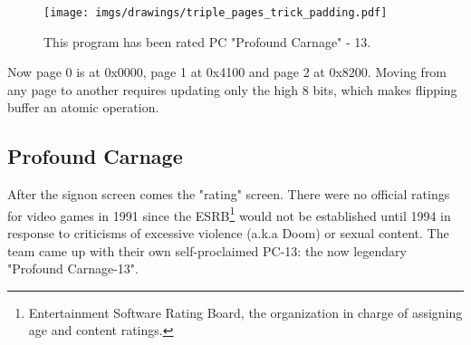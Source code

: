 \documentclass[book.tex]{subfiles}
\begin{document}
\par
\begin{figure}[H]
 \centering
 \texttt{[image: imgs/drawings/triple\_pages\_trick\_padding.pdf]}
 \caption{This program has been rated PC "Profound Carnage" - 13.}
\end{figure}
\par



\par
Now page 0 is at 0x0000, page 1 at 0x4100 and page 2 at 0x8200. Moving from any page to another requires updating only the high 8 bits, which makes flipping buffer an atomic operation.\\












\subsection{Profound Carnage}
After the signon screen comes the "rating" screen. There were no official ratings for video games in 1991 since the ESRB\footnote{Entertainment Software Rating Board, the organization in charge of assigning age and content ratings.} would not be established until 1994 in response to criticisms of excessive violence (a.k.a Doom) or sexual content. The team came up with their own self-proclaimed PC-13: the now legendary "Profound Carnage-13".\\
\begin{figure}[H]
\centering
{}
\end{figure}
\end{document}
